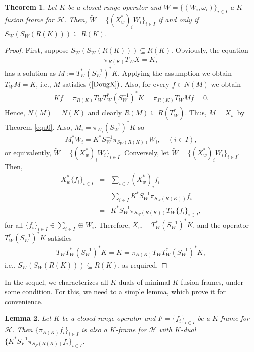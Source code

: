 \documentclass{birkjour}
\newtheorem{thm}{Theorem}[section]
\newtheorem{lem}[thm]{Lemma}
\theoremstyle{definition}
\theoremstyle{remark}
\numberwithin{equation}{section}
\begin{document}
\begin{thm}
Let
 $K$ be a closed range operator and $W = \lbrace (W_{i}, \omega_{i})\rbrace_{i\in I}$ a $K$-fusion frame for $\mathcal{H}$.  Then,  $\widetilde{W}=\{(X_{w}^{*})_{i}W_{i}\}_{i\in I}$  if and only if $S_{W}(S_{W}(R(K)))\subseteq R(K)$.
\end{thm}
\begin{proof}
First, suppose $S_{W}(S_{W}(R(K)))\subseteq R(K)$.  Obviously,  the equation 
\begin{eqnarray}\label{equ1}
\pi_{R(K)}T_{W}X=K,
\end{eqnarray}
has a solution as $M:=T_{W}^{*}(S_{W}^{-1})^{*}K$. Applying the assumption  we obtain $T_{W}M=K$, i.e., $M$ satisfies $(\ref{DougX})$. Also, for every $f\in N(M)$ we obtain 
\begin{eqnarray*}
Kf=\pi_{R(K)}T_{W}T_{W}^{*}(S_{W}^{-1})^{*}K=\pi_{R(K)}T_{W} Mf=0.
\end{eqnarray*}
Hence, $N(M)=N(K)$ and clearly $R(M)\subseteq \overline{R(T_{W}^{*})}$. Thus, 
$M=X_{w}$ by Theorem \ref{equ0}. Also, $M_{i}=\pi_{W_{i}}(S_{W}^{-1})^{*}K$   so
\begin{eqnarray*}
M_{i}^{*}W_{i}=K^{*}S_{W}^{-1}\pi_{S_{W}(R(K))}W_{i}, \quad (i\in I),
\end{eqnarray*}
or equivalently, $\widetilde{W}=\{(X_{w}^{*})_{i}W_{i}\}_{i\in I}$. Conversely, let $\widetilde{W}=\{(X_{w}^{*})_{i}W_{i}\}_{i\in I}$. Then, 
\begin{eqnarray*}
X_{w}^{*}\{f_{i}\}_{i\in I} &=&\sum_{i\in I}(X_{w}^{*})_{i}f_{i}\\
&=&\sum_{i\in I}K^{*}S_{W}^{-1}\pi_{S_{W}(R(K))}f_{i}\\
&=&K^{*}S_{W}^{-1}\pi_{S_{W}(R(K))}T_{W}\{f_{i}\}_{i\in I},
\end{eqnarray*}
for all $\{f_{i}\}_{i\in I}\in \sum_{i\in I}\oplus W_{i}$. Therefore, $X_{w}=T_{W}^{*}(S_{W}^{-1})^{*}K$,   and   the operator $T_{W}^{*}(S_{W}^{-1})^{*}K$ satisfies 
\begin{eqnarray*}
T_{W}T_{W}^{*}(S_{W}^{-1})^{*}K=K=\pi_{R(K)}T_{W}T_{W}^{*}(S_{W}^{-1})^{*}K,
\end{eqnarray*}
i.e., $S_{W}(S_{W}(R(K)))\subseteq R(K)$, as required.
\end{proof}
In the sequel, we   characterizes all $K$-duals of   minimal $K$-fusion frames, under some condition. For this, we need to a simple  lemma, which prove it for convenience.
\begin{lem}\label{prop1R}
Let $K$ be a closed range operator and $F=\{ f_{i} \}_{i\in I}$ be a $K$-frame  for $\mathcal{H}$. Then $\{\pi_{R(K)} f_{i} \}_{i\in I}$ is also a $K$-frame  for $\mathcal{H}$ with $K$-dual $\{ K^{*}S_{F}^{-1}\pi_{S_{F}(R(K))}f_{i} \}_{i\in I}$.
\end{lem}
\end{document}
